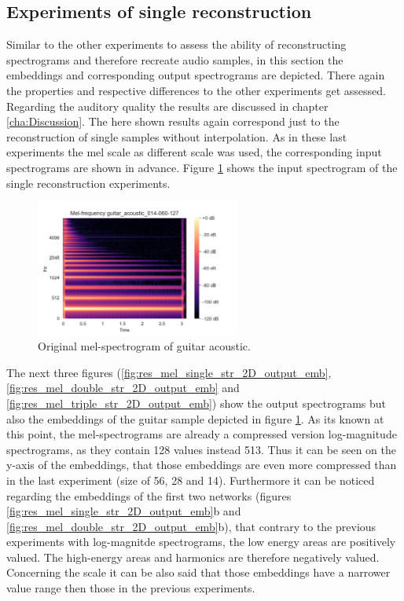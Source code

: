 \subsection{Experiments of single reconstruction}
Similar to the other experiments to assess the ability of reconstructing spectrograms and therefore recreate audio samples, in this section the embeddings and corresponding output spectrograms are depicted. There again the properties and respective differences to the other experiments get assessed. Regarding the auditory quality the results are discussed in chapter \ref{cha:Discussion}. The here shown results again correspond just to the reconstruction of single samples without interpolation. As in these last experiments the mel scale as different scale was used, the corresponding input spectrograms are shown in advance. Figure \ref{fig:res_2D_mel_guit} shows the input spectrogram of the single reconstruction experiments.

\begin{figure}[htb!]
    \centering
    \includegraphics[width=0.60\textwidth]{images/results/mel_guitar_acoustic_014-060-127.png}
    \caption{Original mel-spectrogram of guitar acoustic.}
    \label{fig:res_2D_mel_guit}
\end{figure}

The next three figures (\ref{fig:res_mel_single_str_2D_output_emb}, \ref{fig:res_mel_double_str_2D_output_emb} and \ref{fig:res_mel_triple_str_2D_output_emb}) show the output spectrograms but also the embeddings of the guitar sample depicted in figure \ref{fig:res_2D_mel_guit}. As its known at this point, the mel-spectrograms are already a compressed version log-magnitude spectrograms, as they contain 128 values instead 513. Thus it can be seen on the y-axis of the embeddings, that those embeddings are even more compressed than in the last experiment (size of 56, 28 and 14). Furthermore it can be noticed regarding the embeddings of the first two networks (figures \ref{fig:res_mel_single_str_2D_output_emb}b and \ref{fig:res_mel_double_str_2D_output_emb}b), that contrary to the previous experiments with log-magnitde spectrograms, the low energy areas are positively valued. The high-energy areas and harmonics are therefore negatively valued. Concerning the scale it can be also said that those embeddings have a narrower value range then those in the previous experiments. 

